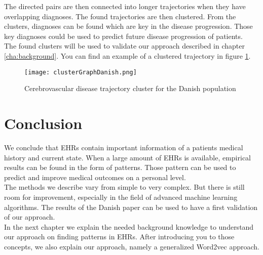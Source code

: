The directed pairs are then connected into longer trajectories when they have overlapping diagnoses. The found trajectories are then clustered. From the clusters, diagnoses can be found which are key in the disease progression. Those key diagnoses could be used to predict future disease progression of patients. \\

The found clusters will be used to validate our approach described in chapter \ref{cha:background}. You can find an example of a clustered trajectory in figure \ref{fig:clusterGraphDanish}.

\begin{figure}[!htb]
	\centering
	\texttt{[image: clusterGraphDanish.png]}
	\caption{Cerebrovascular disease trajectory cluster for the Danish population \cite{Brunak:article}}
	\label{fig:clusterGraphDanish}
\end{figure}


\section{Conclusion}

We conclude that EHRs contain important information of a patients medical history and current state. When a large amount of EHRs is available, empirical results can be found in the form of patterns. Those pattern can be used to predict and improve medical outcomes on a personal level. \\
The methods we describe vary from simple to very complex. But there is still room for improvement, especially in the field of advanced machine learning algorithms. The results of the Danish paper can be used to have a first validation of our approach. \\

In the next chapter we explain the needed background knowledge to understand our approach on finding patterns in EHRs. After introducing you to those concepts, we also explain our approach, namely a generalized Word2vec approach.


